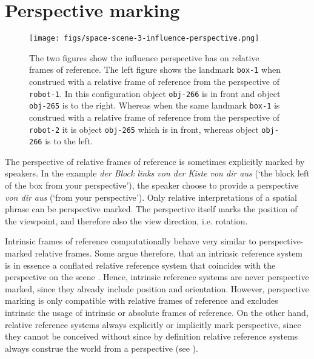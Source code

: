 \section{Perspective marking}

\begin{figure}
\begin{center}
\texttt{[image: figs/space-scene-3-influence-perspective.png]}
\caption[Influence of perspective on relative frames of reference.]
{The two figures show the influence perspective has on relative frames of reference.
The left figure shows the landmark {\footnotesize\tt box-1} when construed with a relative frame of reference
from the perspective of {\footnotesize\tt robot-1}. 
In this configuration object {\footnotesize\tt obj-266} is in front and object {\footnotesize\tt obj-265} is to the right.
Whereas when the same landmark {\footnotesize\tt box-1} is construed with a relative frame of reference
from the perspective of {\footnotesize\tt robot-2} it is object {\footnotesize\tt obj-265} which is in front,
whereas object {\footnotesize\tt obj-266} is to the left.}
\label{f:influence-perspective}
\end{center}
\end{figure}

The perspective of relative frames of reference is sometimes explicitly marked
by speakers. In the example \textit{der Block links von der Kiste von dir aus} (`the block left of the box from your perspective'),
the speaker choose to provide a perspective \textit{von dir aus} (`from your
perspective'). Only relative interpretations of a spatial phrase can be perspective 
marked. The perspective itself marks the position of the viewpoint, and therefore 
also the view direction, i.e. rotation. 

Intrinsic frames of reference computationally behave very similar to perspec\-tive-marked 
relative frames. Some argue therefore, that an intrinsic reference system is in essence a 
conflated relative reference system that coincides with the perspective 
on the scene \citep{levinson1996language}. 
Hence, intrinsic reference systems are never perspective marked, since they already 
include position and orientation. However, perspective marking is only compatible with relative 
frames of reference and excludes intrinsic the usage
of intrinsic or absolute frames of reference. 
On the other hand, relative reference systems always explicitly or implicitly mark 
perspective, since they cannot be conceived without since by definition relative 
reference systems always construe the world from a perspective (see
).

